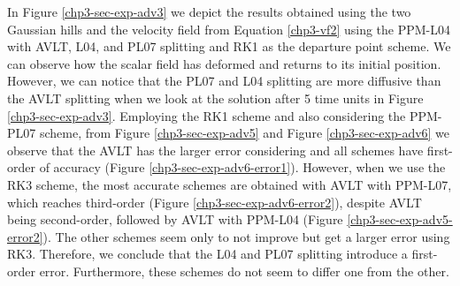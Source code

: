 In Figure \ref{chp3-sec-exp-adv3} we depict the results obtained using the two Gaussian hills and the velocity field from
Equation \eqref{chp3-vf2} using the PPM-L04 with AVLT, L04, and PL07 splitting and RK1 as the departure point scheme.
We can observe how the scalar field has deformed and returns to its initial position. However, we can notice
that the PL07 and L04 splitting are more diffusive than the AVLT splitting when we look at the solution after 5 time units in 
Figure \ref{chp3-sec-exp-adv3}.
Employing the RK1 scheme and also considering the PPM-PL07 scheme, 
from Figure \ref{chp3-sec-exp-adv5} and Figure \ref{chp3-sec-exp-adv6} we observe that the AVLT has the larger error considering and
all schemes have first-order of accuracy (Figure \ref{chp3-sec-exp-adv6-error1}).
However, when we use the RK3 scheme, the most accurate schemes are obtained with AVLT with PPM-L07,
which reaches third-order (Figure \ref{chp3-sec-exp-adv6-error2}), despite AVLT being second-order, followed by AVLT with PPM-L04 (Figure \ref{chp3-sec-exp-adv5-error2}).
The other schemes seem only to not improve but get a larger error using RK3. Therefore, we conclude that the L04 and PL07 splitting 
introduce a first-order error. Furthermore, these schemes do not seem to differ one from the other.
